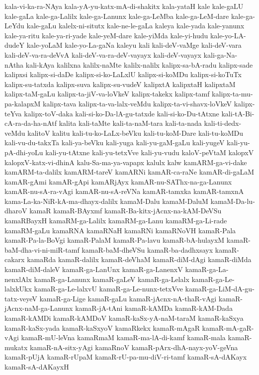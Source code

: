 {kala-vi-ka-ra-NAya
kala-yA-yu-katx-mA-di-shakitx
kala-yataH
kale
kale-gaLU
kale-gaLa
kale-ga-Lalilx
kale-ga-Lanunx
kale-ga-LeMba
kale-ga-LeM-dare
kale-ga-LeYdu
kale-gaLu
kalelx-ni-situtx
kale-ne-le-gaLa
kaleya
kale-yada
kale-yanunx
kale-ya-ritu
kale-ya-ri-yade
kale-yeM-dare
kale-yiMda
kale-yi-hudu
kale-yo-LA-dudeY
kale-yoLaM
kale-yo-La-gaNa
kaleyu
kali
kali-deV-vaMge
kali-deV-vara
kali-deV-va-ra-deVvA
kali-deV-va-ra-deV-vayayx
kali-deV-vayayx
kali-ga-Na-nAtha
kali-kAya
kalilxna
kalilx-naMte
kalilx-nalilx
kalipx-sa-bA-radu
kalipx-sade
kalipxsi
kalipx-si-daDe
kalipx-si-ko-LaLxlU
kalipx-si-koMDu
kalipx-si-koTuTx
kalipx-su-tatxda
kalipx-suva
kalipx-su-vudeV
kalipxtA
kalipxtaH
kalipxtaM
kalipx-taM-gaLu
kalipx-ta-jiV-va-loVkeV
kalipx-takekx
kalipx-tamf
kalipx-ta-mu-pa-kalapxM
kalipx-tava
kalipx-ta-va-lalx-veMdu
kalipx-ta-vi-shavx-loVkeV
kalipx-teYva
kalipx-toV-daka
kali-si-ko-Da-lA-gu-tatxde
kali-si-ko-Du-tAtxne
kali-tA-Bi-cA-ra-da-ha-nAtf
kalita
kali-taMte
kali-ta-naM-tara
kali-ta-nada
kali-ti-dedx-veMdu
kalitoV
kalitu
kali-tu-ko-LaLx-beVku
kali-tu-koM-Dare
kali-tu-koMDu
kali-vu-du-takxTa
kali-ya-beVku
kali-yuga
kali-yu-gaM-gaLu
kali-yugeV
kali-yu-pA-dhi-yoLu
kali-yu-tAtxne
kali-yu-tetxVve
kali-yu-vudu
kaloV-peVtaM
kalopxV
kalopxV-katx-vi-dhinA
kalu-Sa-ma-ya-vapapx
kalulx
kalw
kamARM-ga-vi-dake
kamARM-ta-dalilx
kamARM-tareV
kamARNi
kamAR-ca-raNe
kamAR-di-gaLaM
kamAR-gAmi
kamAR-gApi
kamARjAyx
kamAR-nu-SAThx-na-ga-Lanunx
kamAR-nu-sA-ra-vAgi
kamAR-nu-sA-reVNa
kamAR-tamxka
kamAR-tamxnA
kama-La-ka-NiR-kA-ma-dhayx-dalilx
kamaM-Dalu
kamaM-DaluM
kamaM-Da-lu-dharoV
kamaR
kamaR-BAyxmf
kamaR-Ba-kitx-jAcnx-na-kAM-DeVSu
kamaRBayxH
kamaRM-ga-Lalilx
kamaRM-ga-Lanu
kamaRM-ga-Li-rade
kamaRM-gaLu
kamaRNA
kamaRNaH
kamaRNi
kamaRNoVH
kamaR-Pala
kamaR-Pa-la-BoVgi
kamaR-PalaM
kamaR-Pa-lavu
kamaR-bA-hulayxM
kamaR-baM-dha-vi-ni-miR-tamf
kamaR-baM-dheVSu
kamaR-ba-dadhxsayx
kamaR-cakarx
kamaRda
kamaR-dalilx
kamaR-deVhaM
kamaR-diM-dAgi
kamaR-diMda
kamaR-diM-daleV
kamaR-ga-LanUnx
kamaR-ga-LanenxV
kamaR-ga-La-nenxlAlx
kamaR-ga-Lanunx
kamaR-gaLeV
kamaR-ga-Lelalx
kamaR-ga-Le-lalxkUkx
kamaR-ga-Le-lalxvU
kamaR-ga-Le-nunx-tetxVve
kamaR-ga-LiM-dA-gu-tatx-veyeV
kamaR-ga-Lige
kamaR-gaLu
kamaR-jAcnx-nA-thaR-vAgi
kamaR-jAcnx-naM-ga-Lanunx
kamaR-jA-tAni
kamaR-kAMDa
kamaR-kAM-Dada
kamaR-kAMDi
kamaR-kAMDoV
kamaR-kaSx-yA-naM-taraM
kamaR-kaSxya
kamaR-kaSx-yada
kamaR-kaSxyoV
kamaRkekx
kamaR-mAgaR
kamaR-mA-gaR-vAgi
kamaR-mU-leVna
kamaRmaM
kamaR-ma-lA-di-kamf
kamaR-mala
kamaR-mukatx
kamaR-nA-sitx-yAgi
kamaRnoV
kamaR-pArx-dhA-nayx-yoV-geVna
kamaR-pUjA
kamaR-rUpaM
kamaR-rU-pa-mu-diV-ri-tamf
kamaR-sA-dAKayx
kamaR-sA-dAKayxH
}
